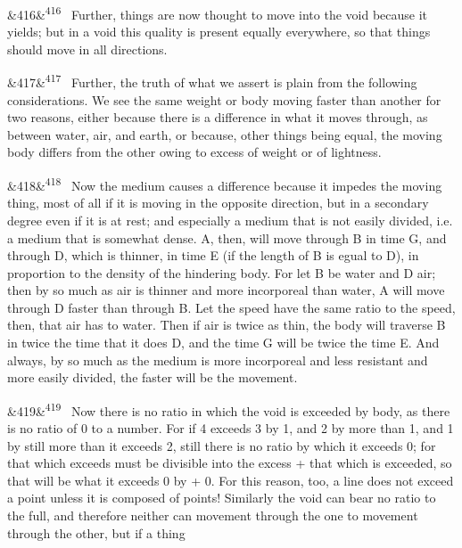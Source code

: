 \documentclass[12pt]{article}
\newcommand{\para}[1][]{\par\noindent\ifx&#1&\else\textsuperscript{\footnotesize #1}~\fi}
\begin{document}
\para[416] Further, things are now thought to move into the void because it yields; but in a void this quality is present equally everywhere, so that things should move in all directions.

\para[417] Further, the truth of what we assert is plain from the following considerations. We see the same weight or body moving faster than another for two reasons, either because there is a difference in what it moves through, as between water, air, and earth, or because, other things being equal, the moving body differs from the other owing to excess of weight or of lightness.

\para[418] Now the medium causes a difference because it impedes the moving thing, most of all if it is moving in the opposite direction, but in a secondary degree even if it is at rest; and especially a medium that is not easily divided, i.e. a medium that is somewhat dense. A, then, will move through B in time G, and through D, which is thinner, in time E (if the length of B is egual to D), in proportion to the density of the hindering body. For let B be water and D air; then by so much as air is thinner and more incorporeal than water, A will move through D faster than through B. Let the speed have the same ratio to the speed, then, that air has to water. Then if air is twice as thin, the body will traverse B in twice the time that it does D, and the time G will be twice the time E. And always, by so much as the medium is more incorporeal and less resistant and more easily divided, the faster will be the movement.

\para[419] Now there is no ratio in which the void is exceeded by body, as there is no ratio of 0 to a number. For if 4 exceeds 3 by 1, and 2 by more than 1, and 1 by still more than it exceeds 2, still there is no ratio by which it exceeds 0; for that which exceeds must be divisible into the excess + that which is exceeded, so that will be what it exceeds 0 by + 0. For this reason, too, a line does not exceed a point unless it is composed of points! Similarly the void can bear no ratio to the full, and therefore neither can movement through the one to movement through the other, but if a thing
\end{document}
